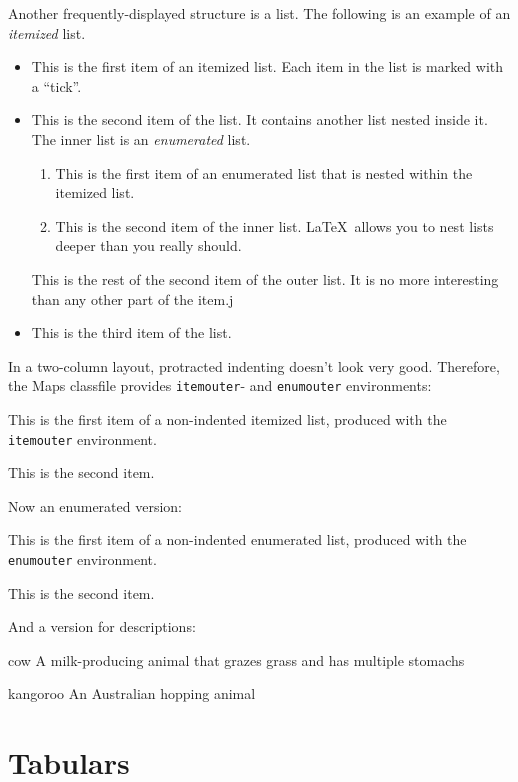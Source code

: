 \documentclass[nosubsub]{maps}
\begin{document}
Another frequently-displayed structure is a list.
The following is an example of an \emph{itemized}
list.
\begin{itemize}
  \item This is the first item of an itemized list.
    Each item in the list is marked with a ``tick''.
  \item This is the second item of the list.  It
    contains another list nested inside it.  The inner
    list is an \emph{enumerated} list.
    \begin{enumerate}
      \item This is the first item of an enumerated
        list that is nested within the itemized list.

      \item This is the second item of the inner list.
        \LaTeX\ allows you to nest lists deeper than
          you really should.
    \end{enumerate}
    This is the rest of the second item of the outer
    list.  It is no more interesting than any other
    part of the item.j
  \item This is the third item of the list.
\end{itemize}
In a two-column layout, protracted indenting doesn't look very
good. Therefore, the Maps classfile provides \texttt{itemouter}- and
\texttt{enumouter} environments:
\begin{itemouter}
\item This is the first item of a non-indented itemized list,
  produced with the \texttt{itemouter} environment.
\item This is the second item.
\end{itemouter}
Now an enumerated version:
\begin{enumouter}
\item This is the first item of a non-indented enumerated list,
  produced with the \texttt{enumouter} environment.
\item This is the second item.
\end{enumouter}
And a version for descriptions:
\begin{descript}
\item[cow] A milk-producing animal that grazes grass and has
multiple stomachs
\item[kangoroo] An Australian hopping animal
\end{descript}

\section{Tabulars}
\end{document}
